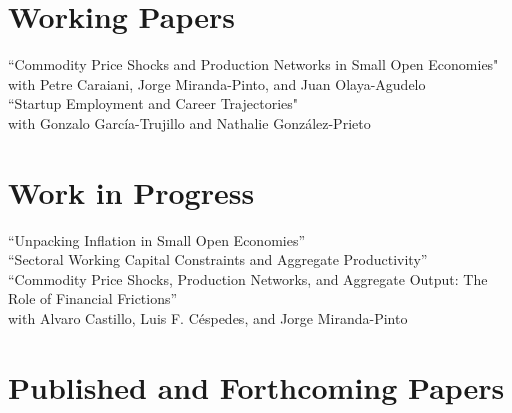 \documentclass[10pt]{article}
\begin{document}
\section*{Working Papers}

    ``Commodity Price Shocks and Production Networks in Small Open Economies"\\
        \indent with Petre Caraiani, Jorge Miranda-Pinto, and Juan Olaya-Agudelo\\[-0.125in]

\noindent ``Startup Employment and Career Trajectories"\\
\indent with Gonzalo Garc\'ia-Trujillo and Nathalie Gonz\'alez-Prieto



\section*{Work in Progress}

``Unpacking Inflation in Small Open Economies''\\[-0.125in]

\noindent ``Sectoral Working Capital Constraints and Aggregate Productivity''\\[-0.125in]

\noindent ``Commodity Price Shocks, Production Networks, and Aggregate Output: The Role of Financial Frictions''\\
\indent with Alvaro Castillo, Luis F. C\'espedes, and Jorge Miranda-Pinto




\section*{Published and Forthcoming Papers}
\iffalse
\begin{enumerate}[wide, labelwidth=!,labelindent=5pt]
    \item Business Cycle Asymmetry and Input-Output Structure: The Role of Firm-to-Firm Networks (2023), with Jorge Miranda-Pinto and Eric R. Young, accepted, \emph{\bfseries Journal of Monetary Economics}.
    \item Quantifying the Inflationary Impact of Fiscal Stimulus Under Supply Constraints (2023), with Julian di Giovanni, \c{S}ebnem Kalemli-\"{O}zcan, and Muhammed A. Y{\i}ld{\i}r{\i}m, Forthcoming, \emph{\bfseries American Economic Association, Papers \& Proceedings}.
    \item Global Supply Chain Pressures, International Trade and Inflation (2022), with Julian di Giovanni, \c{S}ebnem Kalemli-\"{O}zcan, and Muhammed A. Y{\i}ld{\i}r{\i}m,  \textit{\bfseries Conference Proceedings ECB Forum: ``Challenges for Monetary Policy in a Rapidly Changing World''}
    \item Price Controls, Hyperinflation, and the Inflation-Relative Price Variability Relationship (2021), with Rodrigo Cerda and Rolf L\"{u}ders,  \textbf{\textit{Empirical Economics}}, \emph{61}(4), pp. 1725--1748.
\end{enumerate}
\fi
\end{document}
